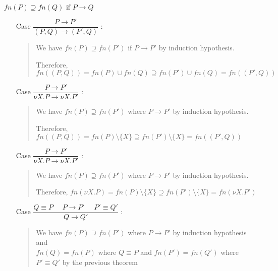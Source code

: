 \begin{frame}[allowframebreaks]{
    $\mathit{fn}(P) \supseteq \mathit{fn}(Q) \mbox{ if } P \longrightarrow Q$
  }
  \scriptsize
  
  \begin{itemize}
  \item[Case] \(\dfrac{P \longrightarrow P'}{(P, Q) \longrightarrow  (P', Q)}\) :\\
    \begin{quote}
      We have \(\mathit{fn}(P) \supseteq \mathit{fn}(P')\) if \(P \longrightarrow P'\)
      by induction hypothesis.

      Therefore,
      \(
      \mathit{fn}((P, Q))
      = \mathit{fn}(P) \cup \mathit{fn}(Q)
      \supseteq \mathit{fn}(P') \cup \mathit{fn}(Q)
      = \mathit{fn}((P', Q))
      \)
    \end{quote}
  \item[Case]
    \(\dfrac{P \longrightarrow P'}{\nu X.P \longrightarrow  \nu X.P'}\) :\\
    \begin{quote}
      We have
      \(\mathit{fn}(P) \supseteq \mathit{fn}(P')\) where \(P \longrightarrow P'\)
      by induction hypothesis.

      Therefore,
      \(
      \mathit{fn}((P, Q))
      = \mathit{fn}(P) \setminus \{X\}
      \supseteq \mathit{fn}(P') \setminus \{X\}
      = \mathit{fn}((P', Q))
      \)
    \end{quote}
  \item[Case] \(\dfrac{P \longrightarrow P'}{\nu X.P \longrightarrow  \nu X.P'}\) :\\
    \begin{quote}
      We have
      \(\mathit{fn}(P) \supseteq \mathit{fn}(P')\) where \(P \longrightarrow P'\)
      by induction hypothesis.

      Therefore,
      \(
      \mathit{fn}(\nu X.P)
      = \mathit{fn}(P) \setminus \{X\}
      \supseteq \mathit{fn}(P') \setminus \{X\}
      = \mathit{fn}(\nu X.P')
      \)
    \end{quote}
  \item[Case] \(
    \dfrac{Q \equiv P \hspace{16pt} P \longrightarrow P' \hspace{16pt} P' \equiv Q'}
          {Q \longrightarrow Q'}
          \) :\\
          \begin{quote}
            We have
            \(\mathit{fn}(P) \supseteq \mathit{fn}(P')\) where \(P \longrightarrow P'\)
            by induction hypothesis and\\
            \(\mathit{fn}(Q) = \mathit{fn}(P)\) where \(Q \equiv P\) and
            \(\mathit{fn}(P') = \mathit{fn}(Q')\) where \(P' \equiv Q'\) 
            by the previous theorem
            

\end{quote}
\end{itemize}
\end{frame}
